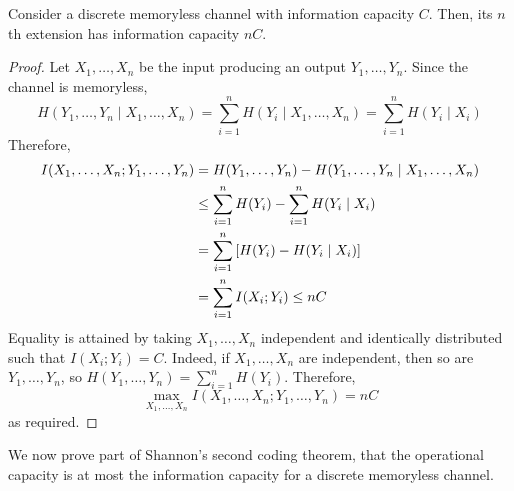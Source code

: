 \begin{lemma}
    Consider a discrete memoryless channel with information capacity \( C \).
    Then, its \( n \)th extension has information capacity \( nC \).
\end{lemma}
\begin{proof}
    Let \( X_1, \dots, X_n \) be the input producing an output \( Y_1, \dots, Y_n \).
    Since the channel is memoryless,
    \[ H(Y_1, \dots, Y_n \mid X_1, \dots, X_n) = \sum_{i=1}^n H(Y_i \mid X_1, \dots, X_n) = \sum_{i=1}^n H(Y_i \mid X_i) \]
    Therefore,
    \begin{align*}
        I(X_1, \dots, X_n; Y_1, \dots, Y_n) &= H(Y_1, \dots, Y_n) - H(Y_1, \dots, Y_n \mid X_1, \dots, X_n) \\
        &\leq \sum_{i=1}^n H(Y_i) - \sum_{i=1}^n H(Y_i \mid X_i) \\
        &= \sum_{i=1}^n \qty[H(Y_i) - H(Y_i \mid X_i)] \\
        &= \sum_{i=1}^n I(X_i;Y_i) \leq nC
    \end{align*}
    Equality is attained by taking \( X_1, \dots, X_n \) independent and identically distributed such that \( I(X_i;Y_i) = C \).
    Indeed, if \( X_1, \dots, X_n \) are independent, then so are \( Y_1, \dots, Y_n \), so \( H(Y_1, \dots, Y_n) = \sum_{i=1}^n H(Y_i) \).
    Therefore,
    \[ \max_{X_1, \dots, X_n} I(X_1, \dots, X_n; Y_1, \dots, Y_n) = nC \]
    as required.
\end{proof}
We now prove part of Shannon's second coding theorem, that the operational capacity is at most the information capacity for a discrete memoryless channel.
